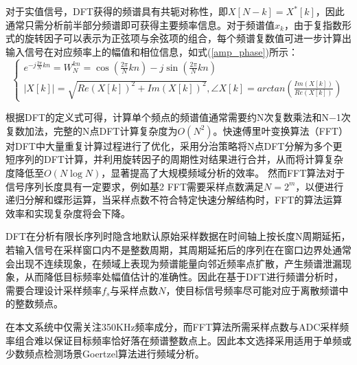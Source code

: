 对于实值信号，DFT获得的频谱具有共轭对称性，即$X[N-k] = X^*[k]$，因此通常只需分析前半部分频谱即可获得主要频率信息。对于频谱值$x_k$，由于复指数形式的旋转因子可以表示为正弦项与余弦项的组合，每个频谱复数值可进一步计算出输入信号在对应频率上的幅值和相位信息，如式(\ref{amp_phase})所示：
\begin{equation}
	\begin{cases}
		e^{-j \frac{2 \pi} {N} k n}=W_N^{kn} = \operatorname{c o s} \left( \frac{2 \pi} {N} k n \right)-j \operatorname{s i n} \left( \frac{2 \pi} {N} k n \right) \\
		\left| X [ k ] \right| = \sqrt{Re(X[k])^2 + Im(X[k])^2}, \angle X [ k ] = arctan\left(\frac{Im(X[k])}{Re(X[k])}\right)  \label{amp_phase}
	\end{cases}
\end{equation}

根据DFT的定义式可得，计算单个频点的频谱值通常需要约N次复数乘法和N−1次复数加法，完整的N点DFT计算复杂度为$O(N^2)$。快速傅里叶变换算法（FFT）对DFT中大量重复计算过程进行了优化，采用分治策略将N点DFT分解为多个更短序列的DFT计算，并利用旋转因子的周期性对结果进行合并，从而将计算复杂度降低至$O(N \log N)$，显著提高了大规模频域分析的效率。
然而FFT算法对于信号序列长度具有一定要求，例如基2 FFT需要采样点数满足$N=2^m$，以便进行递归分解和蝶形运算，当采样点数不符合特定快速分解结构时，FFT的算法运算效率和实现复杂度将会下降。

DFT在分析有限长序列时隐含地默认原始采样数据在时间轴上按长度N周期延拓，若输入信号在采样窗口内不是整数周期，其周期延拓后的序列在在窗口边界处通常会出现不连续现象，在频域上表现为频谱能量向邻近频率点扩散，产生频谱泄漏现象，从而降低目标频率处幅值估计的准确性。因此在基于DFT进行频谱分析时，需要合理设计采样频率$f_s$与采样点数$N$，使目标信号频率尽可能对应于离散频谱中的整数频点。

在本文系统中仅需关注350KHz频率成分，而FFT算法所需采样点数与ADC采样频率组合难以保证目标频率恰好落在频谱整数点上。因此本文选择采用适用于单频或少数频点检测场景Goertzel算法进行频域分析。

